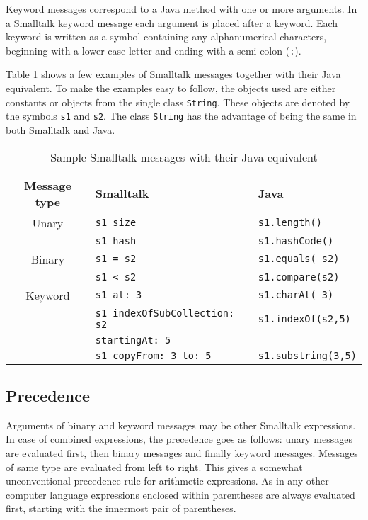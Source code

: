 \documentclass[twoside]{book}
\begin{document}
Keyword messages correspond to a Java method with one or more
arguments. In a Smalltalk keyword message each argument is placed
after a keyword. Each keyword is written as a symbol containing
any alphanumerical characters, beginning with a lower case letter
and ending with a semi colon ({\tt :}).

Table \ref{tb:stMessages} shows a few examples of Smalltalk
messages together with their Java equivalent. To make the examples
easy to follow, the objects used are either constants or objects
from the single class {\tt String}. These objects are denoted by
the symbols {\tt s1} and {\tt s2}. The class {\tt String} has the
advantage of being the same in both Smalltalk and Java.
\begin{table}[h]
  \centering
  \caption{Sample Smalltalk messages with their Java equivalent}\label{tb:stMessages}
\vspace{1 ex}
  \begin{tabular}{|c|l|l|} \hline
    Message type & Smalltalk & Java \\ \hline
    Unary & {\tt s1 size} & {\tt s1.length()} \\
     & {\tt s1 hash} & {\tt s1.hashCode()} \\ \hline
    Binary & {\tt s1 = s2} & {\tt s1.equals( s2)} \\
     & {\tt s1 < s2} & {\tt s1.compare(s2)} \\ \hline
    Keyword & {\tt s1 at: 3} & {\tt s1.charAt( 3)} \\
     & {\tt s1 indexOfSubCollection: s2} & {\tt s1.indexOf(s2,5)} \\
     & \hfil {\tt  startingAt: 5} &  \\
     & {\tt s1 copyFrom: 3 to: 5} & {\tt s1.substring(3,5)} \\ \hline
  \end{tabular}
\end{table}

\subsection{Precedence}
Arguments of binary and keyword messages may be other Smalltalk
expressions. In case of combined expressions, the precedence goes
as follows: unary messages are evaluated first, then binary
messages and finally keyword messages. Messages of same type are
evaluated from left to right. This gives a somewhat unconventional
precedence rule for arithmetic expressions. As in any other
computer language expressions enclosed within parentheses are
always evaluated first, starting with the innermost pair of
parentheses.
\end{document}
